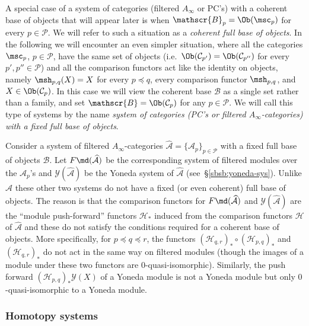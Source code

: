 A special case of a system of categories (filtered $A_{\infty}$ or
PC's) with a coherent base of objects that will appear later is when
$\mathscr{B}_p = \Ob(\msc_p)$ for every $p \in \mathcal{P}$. We will
refer to such a situation as a {\em coherent full base of objects}.
In the following we will encounter an even simpler situation, where
all the categories $\msc_p$, $p \in \mathcal{P}$, have the same set of
objects (i.e.~$\Ob(\mathcal{C}_{p'}) = \Ob(\mathcal{C}_{p''})$ for
every $p', p'' \in \mathcal{P}$) and all the comparison functors act
like the identity on objects, namely $\msh_{p,q}(X) = X$ for every
$p \preceq q$, every comparison functor $\msh_{p,q}$, and
$X \in \Ob(\mathcal{C}_{p})$. In this case we will view the coherent
base $\mathscr{B}$ as a single set rather than a family, and set
$\mathscr{B} = \Ob(\mathcal{C}_p)$ for any $p \in \mathcal{P}$.  We
will call this type of systems by the name {\em system of categories
  (PC's or filtered $A_{\infty}$-categories) with a fixed full base of
  objects}.

\begin{rem} \label{r:coh-base} Consider a system of filtered
  $A_{\infty}$-categories
  $\widehat{\mathcal{A}} = \{\mathcal{A}_p\}_{p \in \mathcal{P}}$ with
  a fixed full base of objects $\mathcal{B}$. Let
  $F\md(\widehat{\mathcal{A}})$ be the corresponding system of
  filtered modules over the $\mathcal{A}_p$'s and
  $\mathcal{Y}(\widehat{\mathcal{A}})$ be the Yoneda system of
  $\widehat{\mathcal{A}}$ (see~\S\ref{sbsb:yoneda-sys}). Unlike
  $\widehat{\mathcal{A}}$ these other two systems do not have a fixed
  (or even coherent) full base of objects. The reason is that the
  comparison functors for $F\md(\widehat{\mathcal{A}})$ and
  $\mathcal{Y}(\widehat{\mathcal{A}})$ are the ``module push-forward''
  functors $\mathcal{H}_*$ induced from the comparison functors
  $\mathcal{H}$ of $\widehat{\mathcal{A}}$ and these do not satisfy
  the conditions required for a coherent base of objects. More
  specifically, for $p \preceq q \preceq r$, the functors
  $(\mathcal{H}_{q,r})_* \circ (\mathcal{H}_{p,q})_*$ and
  $(\mathcal{H}_{q,r})_*$ do not act in the same way on filtered
  modules (though the images of a module under these two functors are
  $0$-quasi-isomorphic). Similarly, the push forward
  $(\mathcal{H}_{p,q})_* \mathcal{Y}(X)$ of a Yoneda module is not a
  Yoneda module but only $0$-quasi-isomorphic to a Yoneda module.
\end{rem}


\subsubsection{Homotopy systems} \label{sbsb:homotopy-sys}

